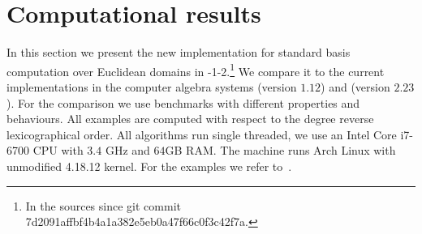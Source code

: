 \section{Computational results}
\label{sec:results}
In this section we present the new implementation for standard basis computation
over Euclidean domains in -1-2.\footnote{In the \singular
sources since git commit 7d2091affbf4b4a1a382e5eb0a47f66c0f3c42f7a.}
We compare it to the current implementations in the
computer algebra systems \macaulay (version $1.12$) and \magma (version $2.23$).
For the comparison we use benchmarks with different properties and behaviours.
All examples are computed with respect to the degree reverse lexicographical order.
All algorithms run single threaded, we use an Intel Core i7-6700 CPU with $3.4$ GHz
and $64$GB RAM. The machine runs Arch Linux with unmodified 4.18.12 kernel. For
the examples we refer to~\cite{singular-benchmarks}.

